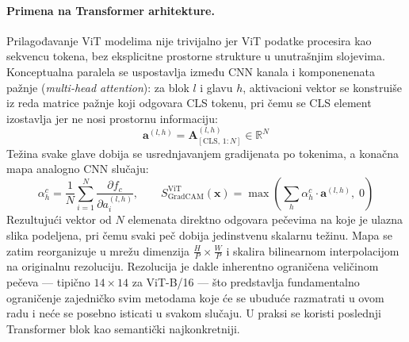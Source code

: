\paragraph{Primena na Transformer arhitekture.}
Prilagođavanje ViT modelima nije trivijalno jer ViT podatke procesira kao sekvencu tokena, 
bez eksplicitne prostorne strukture u unutrašnjim slojevima. Konceptualna paralela se 
uspostavlja između CNN kanala i komponenenata pažnje (\textit{multi-head attention}): za blok $l$ 
i glavu $h$, aktivacioni vektor se konstruiše iz reda matrice pažnje koji odgovara CLS 
tokenu, pri čemu se CLS element izostavlja jer ne nosi prostornu informaciju:
\begin{equation}
    \mathbf{a}^{(l,h)} = \mathbf{A}^{(l,h)}_{[\text{CLS},\, 1:N]} \in \mathbb{R}^{N}
\end{equation}
Težina svake glave dobija se usrednjavanjem gradijenata po tokenima, a konačna mapa 
analogno CNN slučaju:
\begin{equation}
    \alpha_h^c = \frac{1}{N} \sum_{i=1}^{N} \frac{\partial f_c}{\partial a^{(l,h)}_i}, 
    \qquad
    S_{\text{GradCAM}}^{\text{ViT}}(\mathbf{x}) = 
    \max\!\left(\sum_h \alpha_h^c \cdot \mathbf{a}^{(l,h)},\; 0\right)
\end{equation}
Rezultujući vektor od $N$ elemenata direktno odgovara pečevima na koje je ulazna slika 
podeljena, pri čemu svaki peč dobija jedinstvenu skalarnu težinu. Mapa se zatim 
reorganizuje u mrežu dimenzija $\frac{H}{P} \times \frac{W}{P}$ i skalira bilinearnom 
interpolacijom na originalnu rezoluciju. Rezolucija je dakle inherentno ograničena 
veličinom pečeva --- tipično $14 \times 14$ za ViT-B/16 --- što predstavlja fundamentalno 
ograničenje zajedničko svim metodama koje će se ubuduće razmatrati u ovom radu i neće se posebno isticati 
u svakom slučaju. U praksi se koristi poslednji Transformer blok 
\cite{chefer2021transformer} kao semantički najkonkretniji.


%

%

